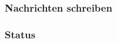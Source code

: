\subsubsection{Nachrichten schreiben}\label{Nachrichten schreiben}
\subsubsection{Status}\label{Status}


